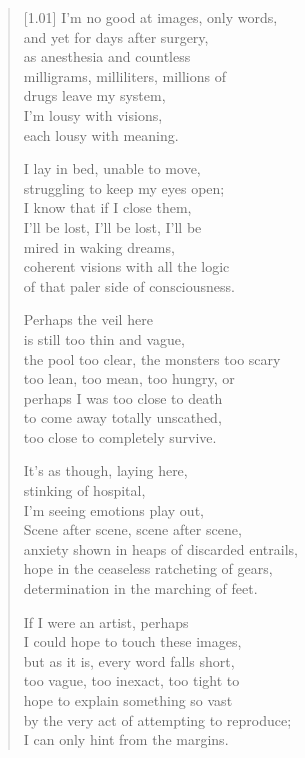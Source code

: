\begin{verse}[1.01\textwidth]
I'm no good at images, only words,\\
and yet for days after surgery,\\
as anesthesia and countless\\
\vin milligrams, milliliters, millions of\\
drugs leave my system,\\
I'm lousy with visions,\\
each lousy with meaning.

I lay in bed, unable to move,\\
struggling to keep my eyes open;\\
I know that if I close them,\\
\vin I'll be lost, I'll be lost, I'll be\\
mired in waking dreams,\\
coherent visions with all the logic\\
of that paler side of consciousness.

Perhaps the veil here\\
is still too thin and vague,\\
the pool too clear, the monsters too scary\\
\vin too lean, too mean, too hungry, or\\
perhaps I was too close to death\\
to come away totally unscathed,\\
too close to completely survive.

\newpage

\vin It's as though, laying here,\\
\vin stinking of hospital,\\
\vin I'm seeing emotions play out,\\
\vin \vin Scene after scene, scene after scene,\\
\vin anxiety shown in heaps of discarded entrails,\\
\vin hope in the ceaseless ratcheting of gears,\\
\vin determination in the marching of feet.

If I were an artist, perhaps\\
I could hope to touch these images,\\
but as it is, every word falls short,\\
\vin too vague, too inexact, too tight to\\
hope to explain something so vast\\
by the very act of attempting to reproduce;\\
I can only hint from the margins.


\end{verse}
